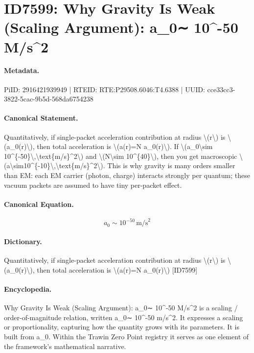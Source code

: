 \section*{ID7599: Why Gravity Is Weak (Scaling Argument): a\_0∼ 10\textasciicircum{}-50 M/s\textasciicircum{}2}
\paragraph{Metadata.}
PiID: 2916421939949 | RTEID: RTE:P29508.6046:T4.6388 | UUID: cce33cc3-3822-5cac-9b5d-568da6754238

\paragraph{Canonical Statement.}
Quantitatively, if single-packet acceleration contribution at radius \textbackslash{}(r\textbackslash{}) is \textbackslash{}(a\_0(r)\textbackslash{}), then total acceleration is \textbackslash{}(a(r)=N a\_0(r)\textbackslash{}). If \textbackslash{}(a\_0\textbackslash{}sim 10\textasciicircum{}\{-50\}\textbackslash{},\textbackslash{}text\{m/s\}\textasciicircum{}2\textbackslash{}) and \textbackslash{}(N\textbackslash{}sim 10\textasciicircum{}\{40\}\textbackslash{}), then you get macroscopic \textbackslash{}(a\textbackslash{}sim10\textasciicircum{}\{-10\}\textbackslash{},\textbackslash{}text\{m/s\}\textasciicircum{}2\textbackslash{}). This is why gravity is many orders smaller than EM: each EM carrier (photon, charge) interacts strongly per quantum; these vacuum packets are assumed to have tiny per-packet effect.

\paragraph{Canonical Equation.}
\[
a_0\sim 10^{-50}\,\text{m/s}^2
\]

\paragraph{Dictionary.}
Quantitatively, if single-packet acceleration contribution at radius \textbackslash{}(r\textbackslash{}) is \textbackslash{}(a\_0(r)\textbackslash{}), then total acceleration is \textbackslash{}(a(r)=N a\_0(r)\textbackslash{}) [ID7599]

\paragraph{Encyclopedia.}
Why Gravity Is Weak (Scaling Argument): a\_0∼ 10\textasciicircum{}-50 M/s\textasciicircum{}2 is a scaling / order-of-magnitude relation, written a\_0∼ 10\textasciicircum{}-50 m/s\textasciicircum{}2. It expresses a scaling or proportionality, capturing how the quantity grows with its parameters. It is built from a\_0. Within the Trawin Zero Point registry it serves as one element of the framework's mathematical narrative.
